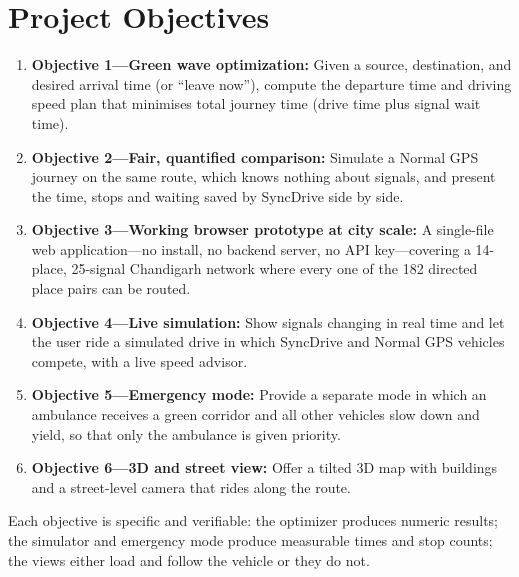 \documentclass[12pt,a4paper]{report}
\begin{document}
\section{Project Objectives}

\begin{enumerate}
  \item \textbf{Objective 1---Green wave optimization:} Given a source,
        destination, and desired arrival time (or ``leave now''), compute the
        departure time and driving speed plan that minimises total journey
        time (drive time plus signal wait time).

  \item \textbf{Objective 2---Fair, quantified comparison:} Simulate a Normal
        GPS journey on the same route, which knows nothing about signals, and
        present the time, stops and waiting saved by SyncDrive side by side.

  \item \textbf{Objective 3---Working browser prototype at city scale:}
        A single-file web application---no install, no backend server, no
        API key---covering a 14-place, 25-signal Chandigarh network where
        every one of the 182 directed place pairs can be routed.

  \item \textbf{Objective 4---Live simulation:} Show signals changing in real
        time and let the user ride a simulated drive in which SyncDrive and
        Normal GPS vehicles compete, with a live speed advisor.

  \item \textbf{Objective 5---Emergency mode:} Provide a separate mode in
        which an ambulance receives a green corridor and all other vehicles
        slow down and yield, so that only the ambulance is given priority.

  \item \textbf{Objective 6---3D and street view:} Offer a tilted 3D map with
        buildings and a street-level camera that rides along the route.
\end{enumerate}

Each objective is specific and verifiable: the optimizer produces numeric
results; the simulator and emergency mode produce measurable times and stop
counts; the views either load and follow the vehicle or they do not.

\end{document}
